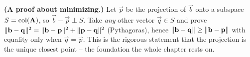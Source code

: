 \begin{exercise}\label{ch19:ex-why-squares}
\textbf{(A proof about minimizing.)} Let $\vec{p}$ be the projection of $\vec{b}$ onto a subspace
$S=\operatorname{col}(\mathbf{A})$, so $\vec{b}-\vec{p}\perp S$. Take \emph{any} other vector $\vec{q}\in S$ and
prove $\lVert\mathbf{b}-\mathbf{q}\rVert^2=\lVert\mathbf{b}-\mathbf{p}\rVert^2+\lVert\mathbf{p}-\mathbf{q}\rVert^2$ (Pythagoras),
hence $\lVert\mathbf{b}-\mathbf{q}\rVert\ge\lVert\mathbf{b}-\mathbf{p}\rVert$ with equality only when $\vec{q}=\vec{p}$.
This is the rigorous statement that the projection is the unique closest point -- the foundation the
whole chapter rests on.
\end{exercise}

